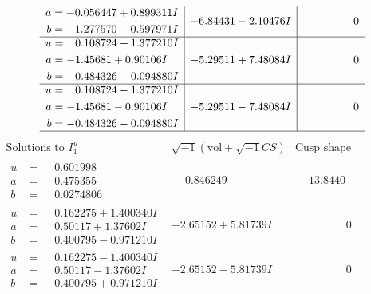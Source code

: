 \documentclass[1p]{elsarticle_modified}
\theoremstyle{definition}
\newcommand{\I}{\sqrt{-1}}
\begin{document}
$$\begin{array}{c|c|c}
\begin{aligned}
a &= -0.056447 + 0.899311 I \\
b &= -1.277570 - 0.597971 I\end{aligned}
 & -6.84431 - 2.10476 I & \phantom{-0.000000 } 0 \\ \hline\begin{aligned}
u &= \phantom{-}0.108724 + 1.377210 I \\
a &= -1.45681 + 0.90106 I \\
b &= -0.484326 + 0.094880 I\end{aligned}
 & -5.29511 + 7.48084 I & \phantom{-0.000000 } 0 \\ \hline\begin{aligned}
u &= \phantom{-}0.108724 - 1.377210 I \\
a &= -1.45681 - 0.90106 I \\
b &= -0.484326 - 0.094880 I\end{aligned}
 & -5.29511 - 7.48084 I & \phantom{-0.000000 } 0\\
 \hline 
 \end{array}$$\newpage$$\begin{array}{c|c|c}  
\text{Solutions to }I^u_{1}& \I (\text{vol} + \sqrt{-1}CS) & \text{Cusp shape}\\
 \hline 
\begin{aligned}
u &= \phantom{-}0.601998\phantom{ +0.000000I} \\
a &= \phantom{-}0.475355\phantom{ +0.000000I} \\
b &= \phantom{-}0.0274806\phantom{ +0.000000I}\end{aligned}
 & \phantom{-}0.846249\phantom{ +0.000000I} & \phantom{-}13.8440\phantom{ +0.000000I} \\ \hline\begin{aligned}
u &= \phantom{-}0.162275 + 1.400340 I \\
a &= \phantom{-}0.50117 + 1.37602 I \\
b &= \phantom{-}0.400795 - 0.971210 I\end{aligned}
 & -2.65152 + 5.81739 I & \phantom{-0.000000 } 0 \\ \hline\begin{aligned}
u &= \phantom{-}0.162275 - 1.400340 I \\
a &= \phantom{-}0.50117 - 1.37602 I \\
b &= \phantom{-}0.400795 + 0.971210 I\end{aligned}
 & -2.65152 - 5.81739 I & \phantom{-0.000000 } 0 \\ \hline\begin{aligned}

\end{aligned}
\end{array}$$
\end{document}
